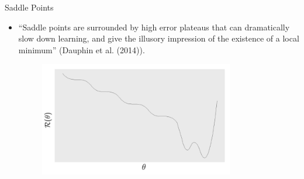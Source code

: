 \documentclass[11pt,compress,t,notes=noshow, xcolor=table]{beamer}
\begin{document}
\begin{vbframe}{Saddle Points}
\begin{itemize}
    \item \enquote{Saddle points are surrounded by high error plateaus that can dramatically slow down learning, and give the illusory impression of the existence of a local minimum} (Dauphin et al. (2014)).
  \begin{figure}
    \centering
    \includegraphics[width=8.5cm]{figure_man/cost.png}
  \end{figure}
  \end{itemize}
\end{vbframe}

\endlecture
\end{document}
